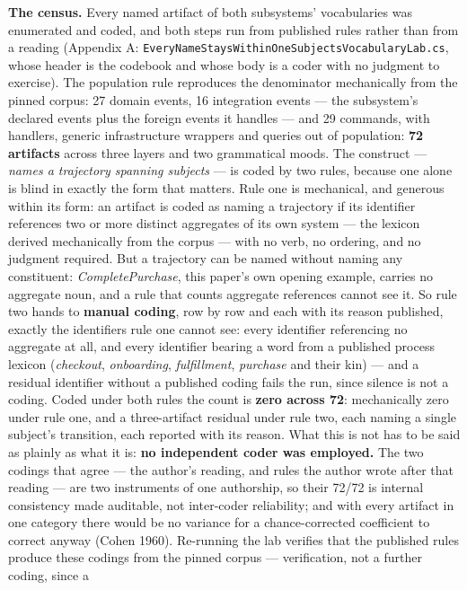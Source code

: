 \documentclass[
]{article}
\begin{document}
\textbf{The census.} Every named artifact of both subsystems'
vocabularies was enumerated and coded, and both steps run from published
rules rather than from a reading (Appendix A:
\texttt{EveryNameStaysWithinOneSubjectsVocabularyLab.cs}, whose header
is the codebook and whose body is a coder with no judgment to exercise).
The population rule reproduces the denominator mechanically from the
pinned corpus: 27 domain events, 16 integration events --- the
subsystem's declared events plus the foreign events it handles --- and
29 commands, with handlers, generic infrastructure wrappers and queries
out of population: \textbf{72 artifacts} across three layers and two
grammatical moods. The construct --- \emph{names a trajectory spanning
subjects} --- is coded by two rules, because one alone is blind in
exactly the form that matters. Rule one is mechanical, and generous
within its form: an artifact is coded as naming a trajectory if its
identifier references two or more distinct aggregates of its own system
--- the lexicon derived mechanically from the corpus --- with no verb,
no ordering, and no judgment required. But a trajectory can be named
without naming any constituent: \emph{CompletePurchase}, this paper's
own opening example, carries no aggregate noun, and a rule that counts
aggregate references cannot see it. So rule two hands to \textbf{manual
coding}, row by row and each with its reason published, exactly the
identifiers rule one cannot see: every identifier referencing no
aggregate at all, and every identifier bearing a word from a published
process lexicon (\emph{checkout}, \emph{onboarding}, \emph{fulfillment},
\emph{purchase} and their kin) --- and a residual identifier without a
published coding fails the run, since silence is not a coding. Coded
under both rules the count is \textbf{zero across 72}: mechanically zero
under rule one, and a three-artifact residual under rule two, each
naming a single subject's transition, each reported with its reason.
What this is not has to be said as plainly as what it is: \textbf{no
independent coder was employed.} The two codings that agree --- the
author's reading, and rules the author wrote after that reading --- are
two instruments of one authorship, so their 72/72 is internal
consistency made auditable, not inter-coder reliability; and with every
artifact in one category there would be no variance for a
chance-corrected coefficient to correct anyway (Cohen 1960). Re-running
the lab verifies that the published rules produce these codings from the
pinned corpus --- verification, not a further coding, since a
\end{document}
